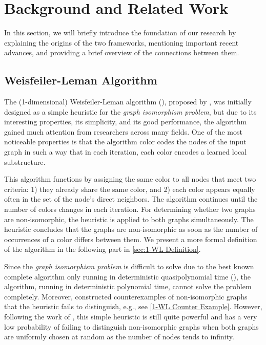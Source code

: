 \section{Background and Related Work}\label{sec:related_work}
In this section, we will briefly introduce the foundation of our research by explaining the origins of the two frameworks, mentioning important recent advances, and providing a brief overview of the connections between them.

\subsection{Weisfeiler-Leman Algorithm}\label{sec:related_work_wl}
The (1-dimensional) Weisfeiler-Leman algorithm (\wl), proposed by \cite{Wei+1968}, was initially designed as a simple heuristic for the \textit{graph isomorphism problem}, but due to its interesting properties, its simplicity, and its good performance, the \wl algorithm gained much attention from researchers across many fields. One of the most noticeable properties is that the algorithm color codes the nodes of the input graph in such a way that in each iteration, each color encodes a learned local substructure.

This algorithm functions by assigning the same color to all nodes that meet two criteria: 1) they already share the same color, and 2) each color appears equally often in the set of the node's direct neighbors. The algorithm continues until the number of colors changes in each iteration. For determining whether two graphs are non-isomorphic, the heuristic is applied to both graphs simultaneously. The heuristic concludes that the graphs are non-isomorphic as soon as the number of occurrences of a color differs between them. We present a more formal definition of the algorithm in the following part in \cref{sec:1-WL Definition}.

Since the \textit{graph isomorphism problem} is difficult to solve due to the best known complete algorithm only running in deterministic quasipolynomial time (\cite{Babai2016}), the \wl algorithm, running in deterministic polynomial time, cannot solve the problem completely. Moreover, \cite{Cai1992} constructed counterexamples of non-isomorphic graphs that the heuristic fails to distinguish, e.g., see \cref{1-WL Counter Example}. However, following the work of \cite{Bab+1979}, this simple heuristic is still quite powerful and has a very low probability of failing to distinguish non-isomorphic graphs when both graphs are uniformly chosen at random as the number of nodes tends to infinity.

